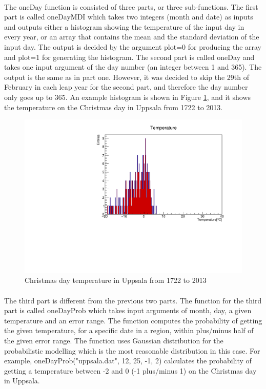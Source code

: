 \documentclass[a4paper,12pt]{article}
\begin{document}
\paragraph{}
The oneDay function is consisted of three parts, or three sub-functions. The first part is called oneDayMDI which takes two integers (month and date) as inputs and outputs either a histogram showing the temperature of the input day in every year, or an array that contains the mean and the standard deviation of the input day. The output is decided by the argument plot=0 for producing the array and plot=1 for generating the histogram. The second part is called oneDay and takes one input argument of the day number (an integer between 1 and 365). The output is the same as in part one. However, it was decided to skip the 29th of February in each leap year for the second part, and therefore the day number only goes up to 365. An example histogram is shown in Figure \ref{fig:oneDayMDI_uppsala}, and it shows the temperature on the Christmas day in Uppsala from 1722 to 2013. 
\begin{figure}[h!]
    \centering
    \includegraphics[scale = 0.8]{oneDayMDI_uppsala.pdf}
    \caption{Christmas day temperature in Uppsala from 1722 to 2013}
    \label{fig:oneDayMDI_uppsala}
\end{figure}
\paragraph{}
The third part is different from the previous two parts. The function for the third part is called oneDayProb which takes input arguments of month, day, a given temperature and an error range. The function computes the probability of getting the given temperature, for a specific date in a region, within plus/minus half of the given error range. The function uses Gaussian distribution for the probabilistic modelling which is the most reasonable distribution in this case. For example, oneDayProb("uppsala.dat", 12, 25, -1, 2) calculates the probability of getting a temperature between -2 and 0 (-1 plus/minus 1) on the Christmas day in Uppsala. 
\end{document}
